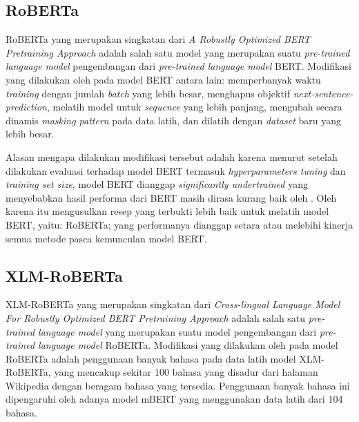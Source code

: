 \subsection{RoBERTa}
\label{2.5.2}
RoBERTa yang merupakan singkatan dari \emph{A Robustly Optimized BERT Pretraining Approach} adalah salah satu model yang merupakan suatu \emph{pre-trained language model} pengembangan dari \emph{pre-trained language model} BERT. Modifikasi yang dilakukan oleh \citet{liu2019roberta} pada model BERT antara lain: memperbanyak waktu \emph{training} dengan jumlah \emph{batch} yang lebih besar, menghapus objektif \emph{next-sentence-prediction}, melatih model untuk \emph{sequence} yang lebih panjang, mengubah secara dinamis \emph{masking pattern} pada data latih, dan dilatih dengan \emph{dataset} baru yang lebih besar. 

Alasan mengapa dilakukan modifikasi tersebut adalah karena menurut \citet{liu2019roberta} setelah dilakukan evaluasi terhadap model BERT termasuk \emph{hyperparameters tuning} dan \emph{training set size}, model BERT dianggap \emph{ significantly undertrained} yang menyebabkan hasil performa dari BERT masih dirasa kurang baik oleh \citeauthor{liu2019roberta}. Oleh karena itu \citet{liu2019roberta} mengusulkan resep yang terbukti lebih baik untuk melatih model BERT, yaitu: RoBERTa; yang performanya dianggap setara atau melebihi kinerja semua metode pasca kemunculan model BERT.

\subsection{XLM-RoBERTa}
\label{2.5.3}
XLM-RoBERTa yang merupakan singkatan dari \emph{Cross-lingual Language Model For Robustly Optimized BERT Pretraining Approach} adalah salah satu \emph{pre-trained language model} yang merupakan suatu model pengembangan dari \emph{pre-trained language model} RoBERTa. Modifikasi yang dilakukan oleh \citet{conneau2020unsupervised} pada model RoBERTa adalah penggunaan banyak bahasa pada data latih model XLM-RoBERTa, yang mencakup sekitar 100 bahasa yang disadur dari halaman Wikipedia dengan beragam bahasa yang tersedia. Penggunaan banyak bahasa ini dipengaruhi oleh adanya model mBERT yang menggunakan data latih dari 104 bahasa.

